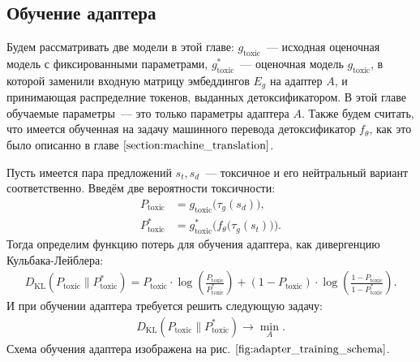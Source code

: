 \subsection{Обучение адаптера} 
\label{section:adapter_training}
Будем рассматривать две модели в этой главе: $g_{\text{toxic}}$~--- исходная оценочная модель с фиксированными параметрами, $g_{\text{toxic}}^{*}$~--- оценочная модель $g_{\text{toxic}}$, в которой заменили входную матрицу эмбеддингов  $E_g$ на адаптер $A$, и принимающая распределние токенов, выданных детоксификатором.  
В этой главе обучаемые параметры~--- это только параметры адаптера $A$.
Также будем считать, что имеется обученная на задачу машинного перевода детоксификатор $f_{\theta}$, как это было описанно в главе $\ref{section:machine_translation}$. 

Пусть имеется пара предложений $s_t, s_d$~--- токсичное и его нейтральный вариант соответственно. 
Введём две вероятности токсичности: 
\begin{align*}
    P_{\text{toxic}} &= g_{\text{toxic}} \bigl(\tau_{g}(s_d) \bigr), \\
    P^{*}_{\text{toxic}} &= g^{*}_{\text{toxic}} \bigl(f_{\theta} \bigl(\tau_{g}(s_t)\bigr) \bigr). 
\end{align*} 
Тогда определим функцию потерь для обучения адаптера, как дивергенцию Кульбака-Лейблера:
\begin{gather*}
    D_\text{KL} \left(P_{\text{toxic}} \parallel P^{*}_{\text{toxic}} \right) 
    = P_{\text{toxic}} \cdot \log\left(\frac{P_{\text{toxic}}}{P^{*}_{\text{toxic}}}\right) 
    + \left(1 - P_{\text{toxic}} \right) \cdot \log\left(\frac{1 - P_{\text{toxic}}}{1 - P^{*}_{\text{toxic}}}\right).
\end{gather*}
И при обучении адаптера требуется решить следующую задачу:
\begin{gather*}
    D_\text{KL}\left(P_{\text{toxic}} \parallel P^{*}_{\text{toxic}} \right) \longrightarrow \min_{A}.
\end{gather*}
Схема обучения адаптера изображена на рис. $\ref{fig:adapter_training_schema}$.
